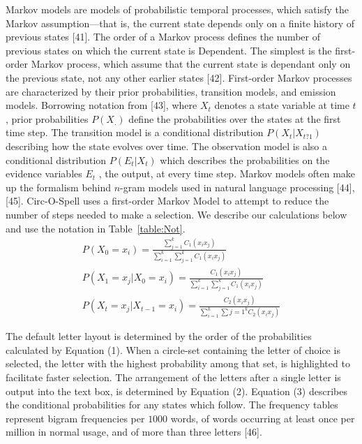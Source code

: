 \documentclass[12pt,titlepage]{article}
\begin{document}
Markov models are models of probabilistic temporal processes, which satisfy the Markov assumption---that
is, the current state depends only on a finite history of previous states [41].  The order of a Markov 
process defines the number of previous states on which the current state is Dependent.  The simplest is 
the first-order Markov process, which assume that the current state is dependant only on the previous 
state, not any other earlier states [42].  First-order Markov processes are characterized by their prior
probabilities, transition models, and emission models.  Borrowing notation from [43], where $X_t$  denotes
a state variable at time $t$, prior probabilities $P(X_.)$ define the probabilities over the states at the first 
time step.  The transition model is a conditional distribution $P(X_t | X_{t?1})$  describing how the state 
evolves over time.  The observation model is also a conditional distribution $P(E_t | X_t)$ which describes 
the probabilities on the evidence variables $E_t$ , the output, at every time step.  Markov models often 
make up the formalism behind $n$-gram models used in natural language processing [44], [45]. 
Circ-O-Spell uses a first-order Markov Model to attempt to reduce the number of steps needed to make 
a selection.  We describe our calculations below and use the notation in Table~\ref{table:Not}.
\begin{gather*}
P(X_0 = x_i) = \frac{\displaystyle \sum_{j=1}^k C_1(x_i x_j)}{\displaystyle \sum_{i=1}^k \sum_{j=1}^k C_1(x_i x_j)} \tag{1} \\
P(X_1 = x_j | X_0 = x_i) = \frac{C_1(x_i x_j)}{\displaystyle \sum_{i=1}^k \sum_{j=1}^k C_1(x_i x_j)} \tag{2} \\
P(X_t = x_j | X_{t-1} = x_i) = \frac{C_2(x_i x_j)}{\displaystyle \sum_{i=1}^k \sum{j=1}^k C_2(x_i x_j)} \tag{3}
\end{gather*}

The default letter layout is determined by the order of the probabilities calculated by Equation (1). 
When a circle-set containing the letter of choice is selected, the letter with the highest probability 
among that set, is highlighted to facilitate faster selection.  The arrangement of the letters after a single 
letter is output into the text box, is determined by Equation (2).  Equation (3) describes the conditional 
probabilities for any states which follow.  The frequency tables represent bigram frequencies per $1000$ 
words, of words occurring at least once per million in normal usage, and of more than three letters [46].
\end{document}
